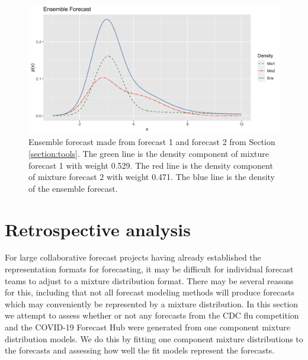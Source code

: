 \documentclass[11pt,notitlepage]{isuthesis}
\begin{document}
\begin{figure}[htbp]
\centerline{\includegraphics[scale=.15]{Images/mix_ense.png}}
\begin{center}
 \begin{minipage}{10cm}
\captionsetup{font=scriptsize}
\caption[Example ensemble forecast]{Ensemble forecast made from forecast 1 and 
forecast 2 from Section \ref{section:tools}. The green line is the density 
component of mixture forecast 1 with weight 0.529. The 
red line is the density component of mixture forecast 2 with weight 
0.471. The blue line is the density of the ensemble forecast.}
\label{fig:mixense}
\end{minipage}
\end{center}
\end{figure}






















\chapter{Retrospective analysis}
\label{section:retrostud}

For large collaborative forecast projects having already established the 
representation formats for forecasting, it may be difficult for individual
forecast teams to adjust to a mixture distribution format. There may be several
reasons for this, including that not all 
forecast modeling methods will produce forecasts which may conveniently be
represented by a mixture distribution.
In this section we attempt to assess whether or not any forecasts from the CDC
flu competition and the COVID-19 Forecast Hub were generated from one component
mixture distribution models. We do this by fitting one component mixture 
distributions to the forecasts and assessing how well the fit models represent
the forecasts.
\end{document}

